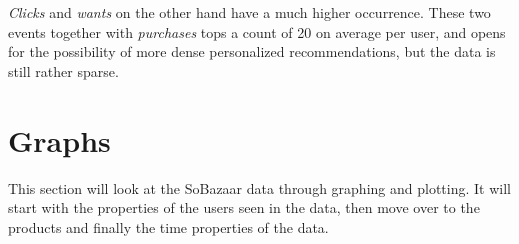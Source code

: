     \emph{Clicks} and \emph{wants} on the other hand have a much higher occurrence. These two events together with \emph{purchases} tops a count of 20 on average per user, and opens for the possibility of more dense personalized recommendations, but the data is still rather sparse.

\section{Graphs}
    This section will look at the SoBazaar data through graphing and plotting.
    It will start with the properties of the users seen in the data, then move over to the products and finally the time properties of the data.

